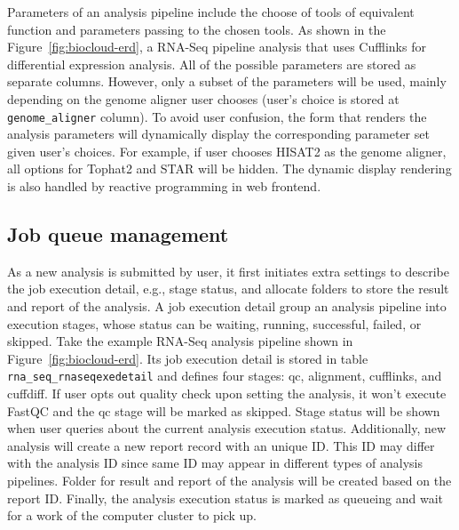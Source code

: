 Parameters of an analysis pipeline include the choose of tools of equivalent
function and parameters passing to the chosen tools. As shown in the
Figure~\ref{fig:biocloud-erd}, a RNA-Seq pipeline analysis that uses Cufflinks
for differential expression analysis. All of the possible parameters are
stored as separate columns. However, only a subset of the parameters will be
used, mainly depending on the genome aligner user chooses (user's choice is stored
at \texttt{genome\_aligner} column). To avoid user confusion, the form that
renders the analysis parameters will dynamically display the corresponding
parameter set given user's choices. For example, if user chooses HISAT2 as the
genome aligner, all options for Tophat2 and STAR will be hidden. The dynamic
display rendering is also handled by reactive programming in web frontend.


\subsection{Job queue management}


As a new analysis is submitted by user, it first initiates extra settings to
describe the job execution detail, e.g., stage status, and allocate folders to
store the result and report of the analysis. A job execution detail group an
analysis pipeline into execution stages, whose status can be waiting, running,
successful, failed, or skipped. Take the example RNA-Seq analysis pipeline
shown in Figure~\ref{fig:biocloud-erd}. Its job execution detail is stored in
table \texttt{rna\_seq\_rnaseqexedetail} and defines four stages: qc,
alignment, cufflinks, and cuffdiff. If user opts out quality check upon setting
the analysis, it won't execute FastQC and the qc stage will be marked as
skipped. Stage status will be shown when user queries about the current
analysis execution status. Additionally, new analysis will create a new report
record with an unique ID. This ID may differ with the analysis ID since same ID
may appear in different types of analysis pipelines. Folder for result and
report of the analysis will be created based on the report ID. Finally, the
analysis execution status is marked as queueing and wait for a work of the
computer cluster to pick up.


